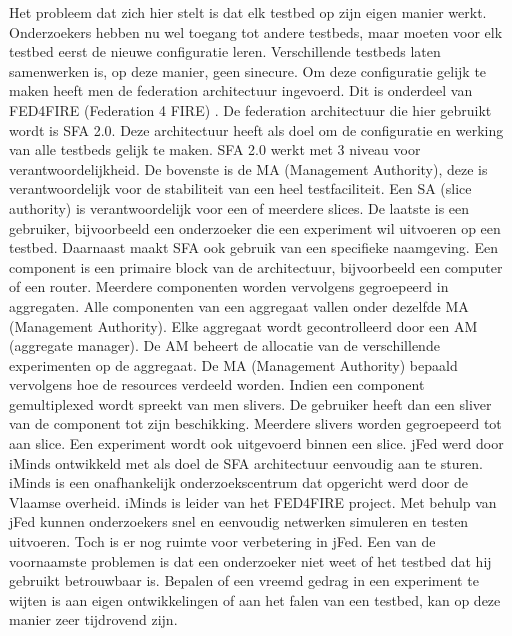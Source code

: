\npar
Het probleem dat zich hier stelt is dat elk testbed op zijn eigen manier werkt. Onderzoekers hebben nu wel toegang tot andere testbeds, maar moeten voor elk testbed eerst de nieuwe configuratie leren. Verschillende testbeds laten samenwerken is, op deze manier, geen sinecure. Om deze configuratie gelijk te maken heeft men de federation architectuur ingevoerd. Dit is onderdeel van FED4FIRE (Federation 4 FIRE) . De federation architectuur die hier gebruikt wordt is SFA 2.0. Deze architectuur heeft als doel om de configuratie en werking van alle testbeds gelijk te maken.
\npar
SFA 2.0 werkt met 3 niveau voor verantwoordelijkheid. De bovenste is de MA (Management Authority), deze is verantwoordelijk voor de stabiliteit van een heel testfaciliteit. Een SA (slice authority) is verantwoordelijk voor een of meerdere slices. De laatste is een gebruiker, bijvoorbeeld een onderzoeker die een experiment wil uitvoeren op een testbed.
\npar
Daarnaast maakt SFA ook gebruik van een specifieke naamgeving. Een component is een primaire block van de architectuur, bijvoorbeeld een computer of een router. Meerdere componenten worden vervolgens gegroepeerd in aggregaten. Alle componenten van een aggregaat vallen onder dezelfde MA (Management Authority). Elke aggregaat wordt gecontrolleerd door een AM (aggregate manager). De AM beheert de allocatie van de verschillende experimenten op de aggregaat.
\npar
De MA (Management Authority) bepaald vervolgens hoe de resources verdeeld worden. Indien een component gemultiplexed wordt spreekt van men slivers. De gebruiker heeft dan een sliver van de component tot zijn beschikking. Meerdere slivers worden gegroepeerd tot aan slice. Een experiment wordt ook uitgevoerd binnen een slice.
\npar
jFed werd door iMinds ontwikkeld\citep{iminds-jFed} met als doel de SFA architectuur eenvoudig aan te sturen. 
iMinds is een onafhankelijk onderzoekscentrum dat opgericht werd door de Vlaamse overheid\citep{iMinds-what-is}. iMinds is leider van het FED4FIRE project\citep{iminds-FED4FIRE}.
Met behulp van jFed kunnen onderzoekers snel en eenvoudig netwerken simuleren en testen uitvoeren. Toch is er nog ruimte voor verbetering in jFed. Een van de voornaamste problemen is dat een onderzoeker niet weet of het testbed dat hij gebruikt betrouwbaar is. Bepalen of een vreemd gedrag in een experiment te wijten is aan eigen ontwikkelingen of aan het falen van een testbed, kan op deze manier zeer tijdrovend zijn.
